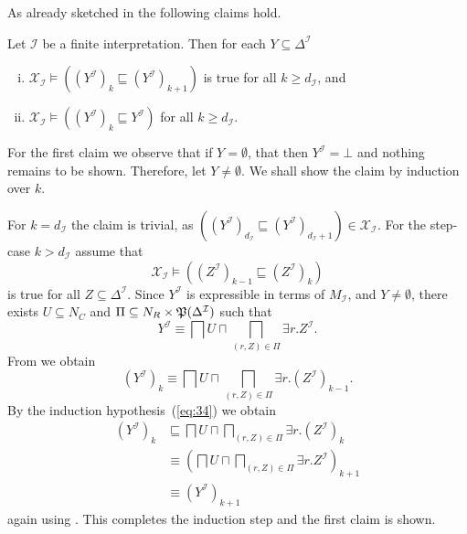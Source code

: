 As already sketched in  the following claims hold.

\begin{Lemma}
  \label{lem:X_I-properties}
  Let $\mathcal{I}$ be a finite interpretation.  Then for each $Y \subseteq
  \Delta^{\mathcal{I}}$
  \begin{enumerate}[i. ]
  \item $\mathcal{X}_{\mathcal{I}} \models ((Y^{\mathcal{I}})_k \sqsubseteq
    (Y^{\mathcal{I}})_{k+1})$ is true for all $k \geq d_{\mathcal{I}}$, and
  \item $\mathcal{X}_{\mathcal{I}} \models ((Y^{\mathcal{I}})_{k} \sqsubseteq
    Y^{\mathcal{I}})$ for all $k \geq d_{\mathcal{I}}$.
  \end{enumerate}
\end{Lemma}
\begin{Proof}
  For the first claim we observe that if $Y = \emptyset$, that then $Y^{\mathcal{I}} =
  \bot$ and nothing remains to be shown.  Therefore, let $Y \neq \emptyset$.  We shall
  show the claim by induction over $k$.

  For $k = d_{\mathcal{I}}$ the claim is trivial, as $((Y^{\mathcal{I}})_{d_{\mathcal{I}}}
  \sqsubseteq (Y^{\mathcal{I}})_{d_{\mathcal{I}}+1}) \in \mathcal{X}_{\mathcal{I}}$.  For
  the step-case $k > d_{\mathcal{I}}$ assume that
  \begin{equation}
    \label{eq:34}
    \mathcal{X}_{\mathcal{I}} \models ((Z^{\mathcal{I}})_{k-1} \sqsubseteq (Z^{\mathcal{I}})_k)
  \end{equation}
  is true for all $Z \subseteq \Delta^{\mathcal{I}}$.  Since $Y^{\mathcal{I}}$ is
  expressible in terms of $M_{\mathcal{I}}$, and $Y \neq \emptyset$, there exists $U
  \subseteq N_C$ and $\Pi \subseteq N_R \times {\ensuremath{\mathfrak{P}(\Delta^{\mathcal{I}})}}$ such that
  \begin{equation*}
    Y^{\mathcal{I}} \equiv \bigsqcap U \sqcap \bigsqcap_{(r, Z) \in \Pi} \exists r. Z^{\mathcal{I}}.
  \end{equation*}
  From  we obtain
  \begin{equation*}
    (Y^{\mathcal{I}})_k \equiv \bigsqcap U \sqcap \bigsqcap_{(r, Z) \in \Pi} \exists r.(Z^{\mathcal{I}})_{k-1}.
  \end{equation*}
  By the induction hypothesis~(\ref{eq:34}) we obtain
  \begin{align*}
    (Y^{\mathcal{I}})_k
    &\sqsubseteq \bigsqcap U \sqcap \bigsqcap_{(r, Z) \in \Pi} \exists
    r. (Z^{\mathcal{I}})_k\\
    &\equiv (\bigsqcap U \sqcap \bigsqcap_{(r, Z) \in \Pi} \exists
    r. Z^{\mathcal{I}})_{k+1} \\
    &\equiv (Y^{\mathcal{I}})_{k+1}
  \end{align*}
  again using .  This completes the induction step
  and the first claim is shown.


\end{Proof}

